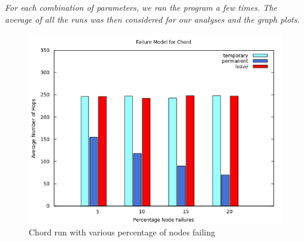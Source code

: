 \documentclass[11pt]{article}
\begin{document}
\textit{For each combination of parameters, we ran the program a few times. The average of all the runs was then considered for our analyses and the graph plots.}
\begin{figure}[h]
    \includegraphics[scale=0.75]{images/failurechord.png}
    \caption{Chord run with various percentage of nodes failing}
    \label{chord_failure}
\end{figure}
\end{document}
